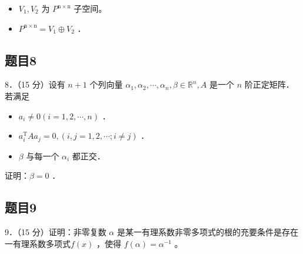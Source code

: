 \documentclass{article}
\begin{document}
\begin{itemize}
  \item[（1）] \(V_{1}, V_{2}\) 为 \(P^{\mathrm{n} \times \mathrm{n}}\) 子空间。
  \item[（2）] \(P^{\mathrm{n} \times \mathrm{n}}=V_{1} \oplus V_{2}\) ．
\end{itemize}

\subsection{题目8}
8．（15 分）设有 \(n+1\) 个列向量 \(\alpha_{1}, \alpha_{2}, \cdots, \alpha_{n}, \beta \in \mathbb{R}^{n}, A\) 是一个 \(n\) 阶正定矩阵．若满足

\begin{itemize}
  \item[（1）] \(a_{i} \neq 0(i=1,2, \cdots, n)\) ．
  \item[（2）] \(a_{i}^{\mathrm{T}} A a_{j}=0,(i, j=1,2, \cdots ; i \neq j)\) ．
  \item[（3）] \(\beta\) 与每一个 \(\alpha_{i}\) 都正交．
\end{itemize}

证明：\(\beta=0\) ．

\subsection{题目9}
9．（15 分）证明：非零复数 \(\alpha\) 是某一有理系数非零多项式的根的充要条件是存在一有理系数多项式\(f(x)\) ，使得 \(f(\alpha)=\alpha^{-1}\) 。
\end{document}
